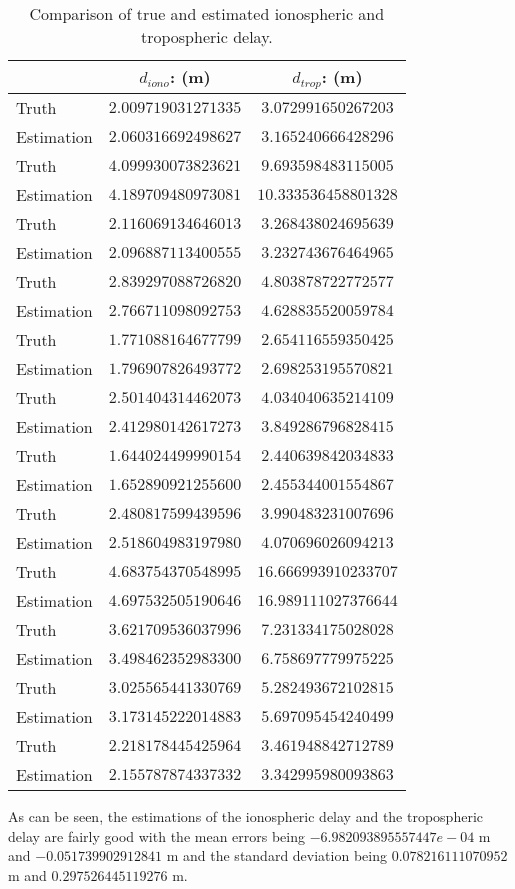 \documentclass[a4paper]{report}
\begin{document}
\begin{table}[h]
\centering
\begin{tabular}{
  l|
  c<{}@{  }|
  c<{}@{  }|
}
\toprule
 & $d_{iono}$: (m) & $d_{trop}$: (m) \\
\midrule
Truth & $2.009719031271335$ &   $3.072991650267203$ \\ 
Estimation & $2.060316692498627$  &  $3.165240666428296$  \\ \hline
Truth & $4.099930073823621$ &   $9.693598483115005$ \\ 
   Estimation &    $4.189709480973081$  &  $10.333536458801328$  \\ \hline
   Truth & $2.116069134646013$ &   $3.268438024695639$ \\ 
   Estimation &    $2.096887113400555$  &  $ 3.232743676464965 $ \\ \hline
   Truth & $2.839297088726820$ &   $4.803878722772577$ \\ 
   Estimation &    $2.766711098092753$  &  $ 4.628835520059784 $ \\ \hline
   Truth & $1.771088164677799$ &   $2.654116559350425$ \\ 
   Estimation &    $1.796907826493772$  &  $ 2.698253195570821 $ \\ \hline
   Truth & $2.501404314462073$ &   $4.034040635214109$ \\ 
   Estimation &    $2.412980142617273$  &  $ 3.849286796828415 $ \\ \hline
   Truth & $1.644024499990154$ &   $2.440639842034833$ \\ 
   Estimation &    $1.652890921255600$  &  $ 2.455344001554867 $ \\ \hline
   Truth & $2.480817599439596$ &   $3.990483231007696$ \\ 
   Estimation &    $2.518604983197980$  &  $ 4.070696026094213 $ \\ \hline
   Truth & $4.683754370548995$ &   $16.666993910233707$ \\ 
   Estimation &    $4.697532505190646$  &  $ 16.989111027376644$  \\ \hline
   Truth & $3.621709536037996$ &   $7.231334175028028$ \\ 
   Estimation &    $3.498462352983300$  &  $ 6.758697779975225 $ \\ \hline
   Truth & $3.025565441330769$ &   $5.282493672102815$ \\ 
   Estimation &    $3.173145222014883$  &  $ 5.697095454240499 $ \\ \hline
   Truth & $2.218178445425964$ &   $3.461948842712789$ \\ 
   Estimation &    $2.155787874337332$  &  $ 3.342995980093863 $ \\ \hline
\bottomrule
\end{tabular}
\caption{Comparison of true and estimated ionospheric and tropospheric delay. }
\label{tab:TAB-TAB}
\end{table}
As can be seen, the estimations of the ionospheric delay and the tropospheric delay are fairly good with the mean errors being $-6.982093895557447e-04$ m and $-0.051739902912841$ m and the standard deviation being $0.078216111070952$ m and $0.297526445119276$ m.
\end{document}
